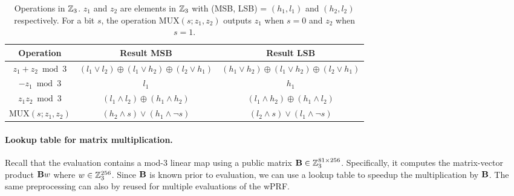 \begin{table}[ht]
\begin{center}
    \begin{tabular}{|c|c|c|}
        \hline
        Operation & Result MSB & Result LSB\\
        \hline\hline
        $z_1 + z_2 \bmod 3$ & $(l_1 \vee l_2) \oplus (l_1 \vee h_2) \oplus (l_2 \vee h_1)$  & $(h_1 \vee h_2) \oplus (l_1 \vee h_2) \oplus (l_2 \vee h_1)$\\
        $-z_1 \bmod 3$ & $l_1$ & $h_1$ \\
        $z_1z_2 \bmod 3$ & $(l_1 \wedge l_2) \oplus (h_1 \wedge h_2)$ & $(l_1 \wedge h_2) \oplus (h_1 \wedge l_2)$\\
        $\textrm{MUX}(s;z_1,z_2)$ & $(h_2 \wedge s) \vee (h_1 \wedge \neg s)$ & $(l_2 \wedge s) \vee (l_1 \wedge \neg s)$\\
        \hline
    \end{tabular}
\end{center}
\caption{Operations in $\mathbb{Z}_3$. $z_1$ and $z_2$ are elements in $\mathbb{Z}_3$ with (MSB, LSB) = $(h_1,l_1)$ and $(h_2, l_2)$ respectively. For a bit $s$, the operation $\textrm{MUX}(s;z_1, z_2)$ outputs $z_1$ when $s=0$ and $z_2$ when $s=1$.}
\label{table:z3_operations}
\end{table}



\paragraph{Lookup table for matrix multiplication.} Recall that the \ttwPRF evaluation contains a mod-3 linear map using a public matrix $\mat{B} \in \Z_3^{81\times256}$. Specifically, it computes the matrix-vector product $\mat{B}w$ where $w \in \mathbb{Z}_3^{256}$. Since $\mat{B}$ is known prior to evaluation, we can use a lookup table to speedup the multiplication by $\mat{B}$\cite{arlazarov1970economical}. The same preprocessing can also by reused for multiple evaluations of the wPRF.

